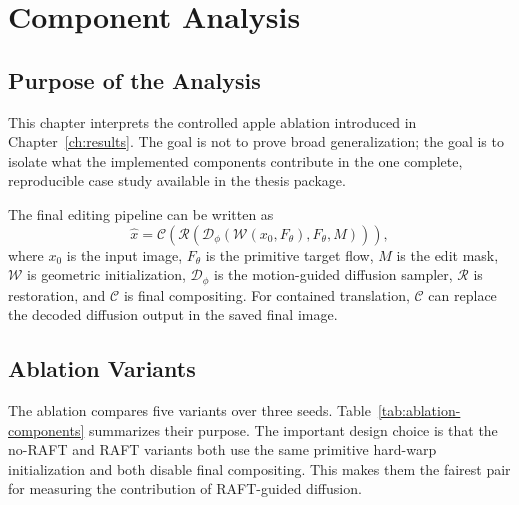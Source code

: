 \setlength{\footskip}{8mm}

\chapter{Component Analysis}
\label{ch:ablation}

\section{Purpose of the Analysis}

This chapter interprets the controlled apple ablation introduced in Chapter~\ref{ch:results}. The goal is not to prove broad generalization; the goal is to isolate what the implemented components contribute in the one complete, reproducible case study available in the thesis package.

The final editing pipeline can be written as
\begin{equation}
  \hat{x} =
  \mathcal{C}
  \left(
  \mathcal{R}
  \left(
  \mathcal{D}_{\phi}
  \left(
  \mathcal{W}(x_0, F_\theta), F_\theta, M
  \right)
  \right)
  \right),
\end{equation}
where $x_0$ is the input image, $F_\theta$ is the primitive target flow, $M$ is the edit mask, $\mathcal{W}$ is geometric initialization, $\mathcal{D}_{\phi}$ is the motion-guided diffusion sampler, $\mathcal{R}$ is restoration, and $\mathcal{C}$ is final compositing. For contained translation, $\mathcal{C}$ can replace the decoded diffusion output in the saved final image.

\section{Ablation Variants}

The ablation compares five variants over three seeds. Table~\ref{tab:ablation-components} summarizes their purpose. The important design choice is that the no-RAFT and RAFT variants both use the same primitive hard-warp initialization and both disable final compositing. This makes them the fairest pair for measuring the contribution of RAFT-guided diffusion.

